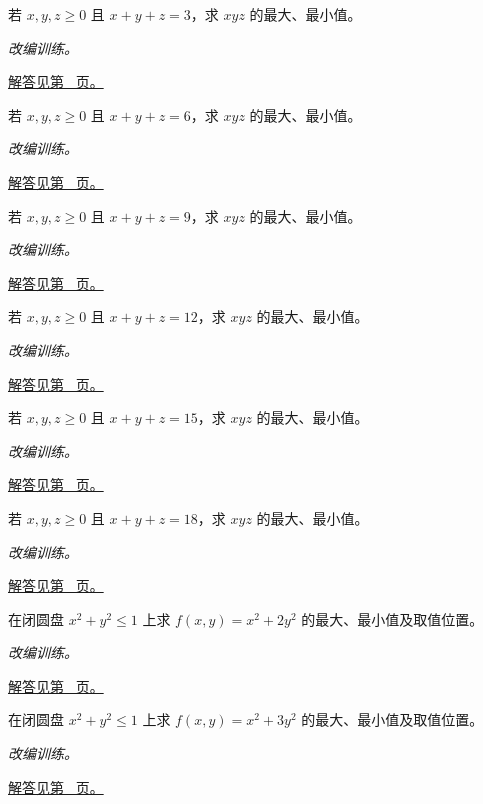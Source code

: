 \documentclass[12pt,fontset=fandol]{ctexart}
\begin{document}
\begin{example}[正数定和时的三元乘积]\label{ex:c35q7}
若 $x,y,z\ge0$ 且 $x+y+z=3$，求 $xyz$ 的最大、最小值。
\par\textit{改编训练。}\par\hyperref[ans:c35q7]{解答见第~\pageref{ans:c35q7} 页。}
\end{example}
\begin{example}[正数定和时的三元乘积]\label{ex:c35q8}
若 $x,y,z\ge0$ 且 $x+y+z=6$，求 $xyz$ 的最大、最小值。
\par\textit{改编训练。}\par\hyperref[ans:c35q8]{解答见第~\pageref{ans:c35q8} 页。}
\end{example}
\begin{example}[正数定和时的三元乘积]\label{ex:c35q9}
若 $x,y,z\ge0$ 且 $x+y+z=9$，求 $xyz$ 的最大、最小值。
\par\textit{改编训练。}\par\hyperref[ans:c35q9]{解答见第~\pageref{ans:c35q9} 页。}
\end{example}
\begin{example}[正数定和时的三元乘积]\label{ex:c35q10}
若 $x,y,z\ge0$ 且 $x+y+z=12$，求 $xyz$ 的最大、最小值。
\par\textit{改编训练。}\par\hyperref[ans:c35q10]{解答见第~\pageref{ans:c35q10} 页。}
\end{example}
\begin{example}[正数定和时的三元乘积]\label{ex:c35q11}
若 $x,y,z\ge0$ 且 $x+y+z=15$，求 $xyz$ 的最大、最小值。
\par\textit{改编训练。}\par\hyperref[ans:c35q11]{解答见第~\pageref{ans:c35q11} 页。}
\end{example}
\begin{example}[正数定和时的三元乘积]\label{ex:c35q12}
若 $x,y,z\ge0$ 且 $x+y+z=18$，求 $xyz$ 的最大、最小值。
\par\textit{改编训练。}\par\hyperref[ans:c35q12]{解答见第~\pageref{ans:c35q12} 页。}
\end{example}
\begin{example}[圆盘上的二次型]\label{ex:c35q13}
在闭圆盘 $x^2+y^2\le1$ 上求 $f(x,y)=x^2+2y^2$ 的最大、最小值及取值位置。
\par\textit{改编训练。}\par\hyperref[ans:c35q13]{解答见第~\pageref{ans:c35q13} 页。}
\end{example}
\begin{example}[圆盘上的二次型]\label{ex:c35q14}
在闭圆盘 $x^2+y^2\le1$ 上求 $f(x,y)=x^2+3y^2$ 的最大、最小值及取值位置。
\par\textit{改编训练。}\par\hyperref[ans:c35q14]{解答见第~\pageref{ans:c35q14} 页。}
\end{example}
\end{document}
